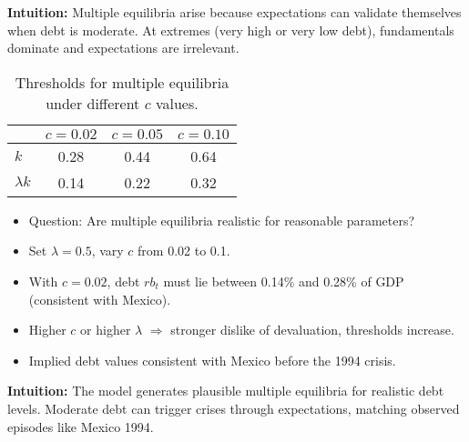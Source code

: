 \documentclass[12pt]{article}
\begin{document}
\textbf{Intuition:} Multiple equilibria arise because expectations can validate themselves when debt is moderate. At extremes (very high or very low debt), fundamentals dominate and expectations are irrelevant.

\begin{table}[H]
\centering
\begin{tabular}{lccc}
\hline
 & $c=0.02$ & $c=0.05$ & $c=0.10$ \\
\hline
$k$   & 0.28 & 0.44 & 0.64 \\
$\lambda k$ & 0.14 & 0.22 & 0.32 \\
\hline
\end{tabular}
\caption{Thresholds for multiple equilibria under different $c$ values.}
\end{table}

\begin{itemize}
    \item Question: Are multiple equilibria realistic for reasonable parameters?
    \item Set $\lambda = 0.5$, vary $c$ from 0.02 to 0.1.
    \item With $c=0.02$, debt $rb_t$ must lie between 0.14\% and 0.28\% of GDP (consistent with Mexico).
    \item Higher $c$ or higher $\lambda$ $\Rightarrow$ stronger dislike of devaluation, thresholds increase.
    \item Implied debt values consistent with Mexico before the 1994 crisis.
\end{itemize}

\textbf{Intuition:} The model generates plausible multiple equilibria for realistic debt levels. Moderate debt can trigger crises through expectations, matching observed episodes like Mexico 1994.
\end{document}
